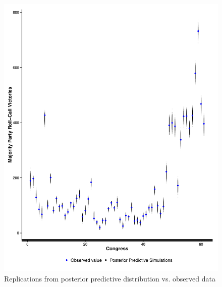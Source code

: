 \begin{figure}
\centering
	\includegraphics[scale=0.5]{sections/figs/ck_pp_nWins}
\caption{Replications from posterior predictive distribution vs. observed data}
\label{fig:ck_pp_nWins}
\end{figure}

